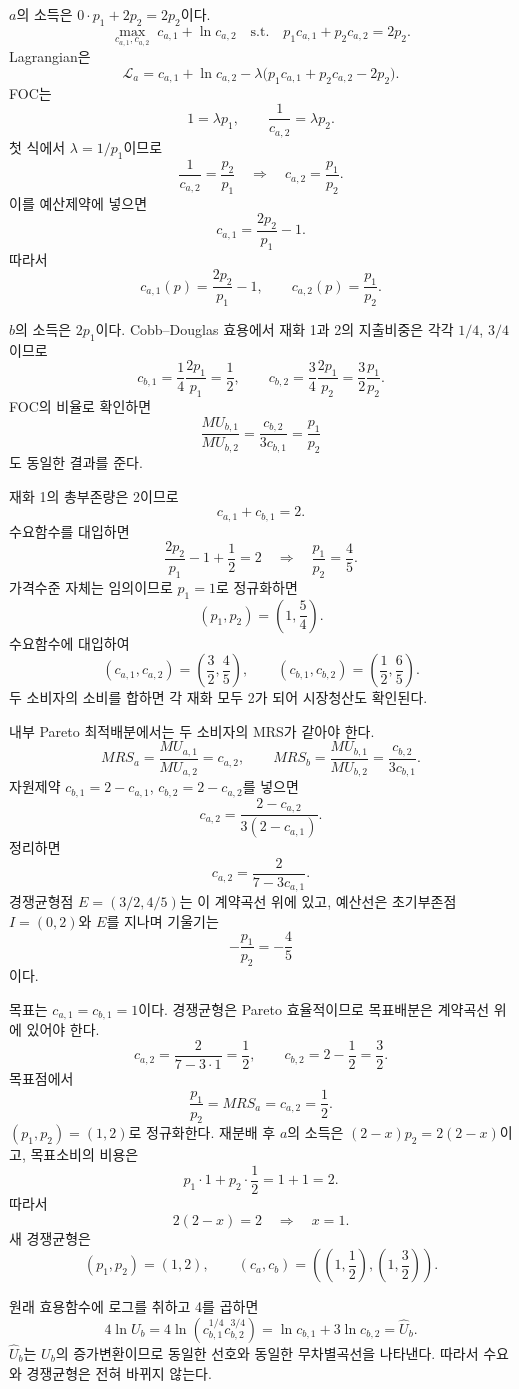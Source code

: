 \begin{solutionbox}
$a$의 소득은 $0\cdot p_1+2p_2=2p_2$이다.
\[
\max_{c_{a,1},c_{a,2}}\;c_{a,1}+\ln c_{a,2}
\quad\text{s.t.}\quad p_1c_{a,1}+p_2c_{a,2}=2p_2.
\]
Lagrangian은
\[
\mathcal L_a=c_{a,1}+\ln c_{a,2}
-\lambda\bigl(p_1c_{a,1}+p_2c_{a,2}-2p_2\bigr).
\]
FOC는
\[
1=\lambda p_1,\qquad \frac1{c_{a,2}}=\lambda p_2.
\]
첫 식에서 $\lambda=1/p_1$이므로
\[
\frac1{c_{a,2}}=\frac{p_2}{p_1}
\quad\Longrightarrow\quad c_{a,2}=\frac{p_1}{p_2}.
\]
이를 예산제약에 넣으면
\[
c_{a,1}=\frac{2p_2}{p_1}-1.
\]
따라서
\[
\boxed{c_{a,1}(p)=\frac{2p_2}{p_1}-1,\qquad c_{a,2}(p)=\frac{p_1}{p_2}}.
\]

$b$의 소득은 $2p_1$이다. Cobb--Douglas 효용에서 재화 1과 2의 지출비중은 각각 $1/4$, $3/4$이므로
\[
c_{b,1}=\frac14\frac{2p_1}{p_1}=\frac12,
\qquad
c_{b,2}=\frac34\frac{2p_1}{p_2}=\frac32\frac{p_1}{p_2}.
\]
FOC의 비율로 확인하면
\[
\frac{MU_{b,1}}{MU_{b,2}}
=\frac{c_{b,2}}{3c_{b,1}}=\frac{p_1}{p_2}
\]
도 동일한 결과를 준다.

재화 1의 총부존량은 2이므로
\[
c_{a,1}+c_{b,1}=2.
\]
수요함수를 대입하면
\[
\frac{2p_2}{p_1}-1+\frac12=2
\quad\Longrightarrow\quad
\frac{p_1}{p_2}=\frac45.
\]
가격수준 자체는 임의이므로 $p_1=1$로 정규화하면
\[
(p_1,p_2)=\left(1,\frac54\right).
\]
수요함수에 대입하여
\[
(c_{a,1},c_{a,2})=\left(\frac32,\frac45\right),
\qquad
(c_{b,1},c_{b,2})=\left(\frac12,\frac65\right).
\]
두 소비자의 소비를 합하면 각 재화 모두 2가 되어 시장청산도 확인된다.

내부 Pareto 최적배분에서는 두 소비자의 MRS가 같아야 한다.
\[
MRS_a=\frac{MU_{a,1}}{MU_{a,2}}=c_{a,2},
\qquad
MRS_b=\frac{MU_{b,1}}{MU_{b,2}}=\frac{c_{b,2}}{3c_{b,1}}.
\]
자원제약 $c_{b,1}=2-c_{a,1}$, $c_{b,2}=2-c_{a,2}$를 넣으면
\[
c_{a,2}=\frac{2-c_{a,2}}{3(2-c_{a,1})}.
\]
정리하면
\[
\boxed{c_{a,2}=\frac{2}{7-3c_{a,1}}}.
\]
경쟁균형점 $E=(3/2,4/5)$는 이 계약곡선 위에 있고, 예산선은 초기부존점 $I=(0,2)$와 $E$를 지나며 기울기는
\[
-\frac{p_1}{p_2}=-\frac45
\]
이다.

목표는 $c_{a,1}=c_{b,1}=1$이다. 경쟁균형은 Pareto 효율적이므로 목표배분은 계약곡선 위에 있어야 한다.
\[
c_{a,2}=\frac{2}{7-3\cdot1}=\frac12,
\qquad c_{b,2}=2-\frac12=\frac32.
\]
목표점에서
\[
\frac{p_1}{p_2}=MRS_a=c_{a,2}=\frac12.
\]
$(p_1,p_2)=(1,2)$로 정규화한다. 재분배 후 $a$의 소득은 $(2-x)p_2=2(2-x)$이고, 목표소비의 비용은
\[
p_1\cdot1+p_2\cdot\frac12=1+1=2.
\]
따라서
\[
2(2-x)=2\quad\Longrightarrow\quad \boxed{x=1}.
\]
새 경쟁균형은
\[
(p_1,p_2)=(1,2),\qquad
(c_a,c_b)=\left(\left(1,\frac12\right),\left(1,\frac32\right)\right).
\]

원래 효용함수에 로그를 취하고 4를 곱하면
\[
4\ln U_b
=4\ln\left(c_{b,1}^{1/4}c_{b,2}^{3/4}\right)
=\ln c_{b,1}+3\ln c_{b,2}=\widehat U_b.
\]
$\widehat U_b$는 $U_b$의 증가변환이므로 동일한 선호와 동일한 무차별곡선을 나타낸다. 따라서 수요와 경쟁균형은 전혀 바뀌지 않는다.
\end{solutionbox}

